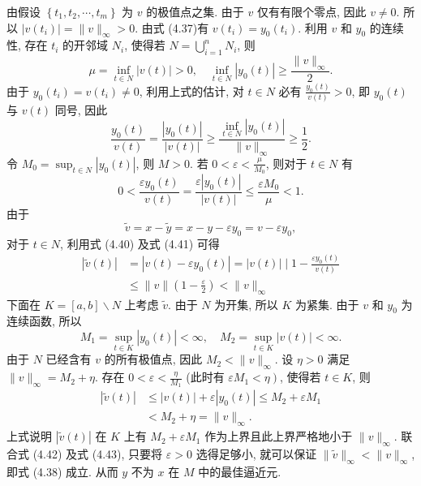 \documentclass[openany]{ctexbook}
\makeatletter
\theoremstyle{kaiti}
\theoremstyle{normal}
\renewenvironment{proof}[1][\proofname]{\par
    \pushQED{\qed}%
    \normalfont \topsep6\p@\@plus6\p@\relax
    \trivlist
    \item\relax
    {\heiti #1}\hspace{2\labelsep}\ignorespaces
  }{%
    \popQED\endtrivlist\@endpefalse
  }
\makeatother
\begin{document}
\begin{proof}
由假设 $\left\{t_1, t_2, \cdots, t_m\right\}$ 为 $v$ 的极值点之集. 由于 $v$ 仅有有限个零点, 因此 $v \neq 0$. 所以 $\left|v\left(t_{i}\right)\right|=\|v\|_{\infty}>0$. 由式 (4.37)有 $v\left(t_{i}\right)=y_0\left(t_{i}\right)$. 利用 $v$ 和 $y_0$ 的连续性, 存在 $t_{i}$ 的开邻域 $N_{i}$, 使得若 $N=\bigcup_{i=1}^n N_{i}$, 则
\begin{equation}
  \mu=\inf_{t \in N}|v(t)|>0, \quad \inf_{t \in N}\left|y_0(t)\right| \geqslant \frac{\|v\|_{\infty}}{2}.
\end{equation}
由于 $y_0\left(t_{i}\right)=v\left(t_{i}\right) \neq 0$, 利用上式的估计, 对 $t \in N$ 必有 $\frac{y_0(t)}{v(t)}>0$, 即 $y_0(t)$ 与 $v(t)$ 同号, 因此
\begin{equation}
  \frac{y_0(t)}{v(t)}=\frac{\left|y_0(t)\right|}{|v(t)|} \geqslant \frac{\inf_{t \in N}\left|y_0(t)\right|}{\|v\|_{\infty}} \geqslant \frac{1}{2}.
\end{equation}
令 $M_0=\sup_{t \in N}\left|y_0(t)\right|$, 则 $M>0$. 若 $0<\varepsilon<\frac{\mu}{M_0}$, 则对于 $t \in N$ 有
\begin{equation}
  0<\frac{\varepsilon y_0(t)}{v(t)}=\frac{\varepsilon\left|y_0(t)\right|}{|v(t)|} \leqslant \frac{\varepsilon M_0}{\mu}<1.
\end{equation}
由于
$$
\widetilde{v}=x-\tilde{y}=x-y-\varepsilon y_0=v-\varepsilon y_0,
$$
对于 $t \in N$, 利用式 (4.40) 及式 (4.41) 可得
\begin{equation}
  \begin{aligned}
    |\widetilde{v}(t)| &=\left|v(t)-\varepsilon y_0(t)\right|=|v(t)| \mid 1-\frac{\varepsilon y_0(t)}{v(t)} \\
    & \leqslant\|v\|\left(1-\frac{\varepsilon}{2}\right)<\|v\|_{\infty}
  \end{aligned}
\end{equation}
下面在 $K=[a, b] \backslash N$ 上考虑 $\widetilde{v}$. 由于 $N$ 为开集, 所以 $K$ 为紧集. 由于 $v$ 和 $y_0$ 为连续函数, 所以
$$
M_1=\sup_{t \in K}\left|y_0(t)\right|<\infty, \quad M_2=\sup_{t \in K}|v(t)|<\infty.
$$
由于 $N$ 已经含有 $v$ 的所有极值点, 因此 $M_2<\|v\|_{\infty}$. 设 $\eta>0$ 满足 $\|v\|_{\infty}=M_2+\eta$. 存在 $0<\varepsilon<\frac{\eta}{M_1}$ (此时有 $\left.\varepsilon M_1<\eta\right)$, 使得若 $t \in K$, 则
\begin{equation}
  \begin{aligned}
    |\widetilde{v}(t)| &\leqslant|v(t)|+\varepsilon\left|y_0(t)\right| \leqslant M_2+\varepsilon M_1\\
    &<M_2+\eta=\|v\|_{\infty}.
  \end{aligned}
\end{equation}
上式说明 $|\widetilde{v}(t)|$ 在 $K$ 上有 $M_2+\varepsilon M_1$ 作为上界且此上界严格地小于 $\|v\|_{\infty}$. 联合式 (4.42) 及式 (4.43), 只要将 $\varepsilon>0$ 选得足够小, 就可以保证 $\|\widetilde{v}\|_{\infty}<\|v\|_{\infty}$, 即式 (4.38) 成立. 从而 $y$ 不为 $x$ 在 $M$ 中的最佳逼近元.
\end{proof}
\end{document}
